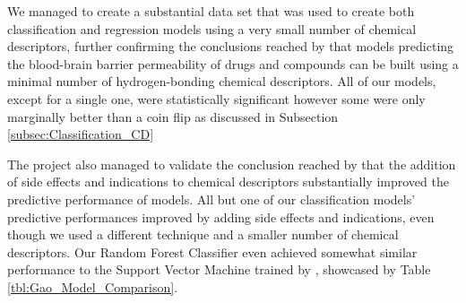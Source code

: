 We managed to create a substantial data set that was used to create both classification and regression models using a very small number of chemical descriptors, further confirming the conclusions reached by \citet{Zhao2007, Saber2020} that models predicting the blood-brain barrier permeability of drugs and compounds can be built using a minimal number of hydrogen-bonding chemical descriptors. All of our models, except for a single one, were statistically significant however some were only marginally better than a coin flip as discussed in Subsection \ref{subsec:Classification_CD}

The project also managed to validate the conclusion reached by \cite{Gao2017} that the addition of side effects and indications to chemical descriptors substantially improved the predictive performance of models. All but one of our classification models' predictive performances improved by adding side effects and indications, even though we used a different technique and a smaller number of chemical descriptors. Our Random Forest Classifier even achieved somewhat similar performance to the Support Vector Machine trained by \citet{Gao2017}, showcased by Table \ref{tbl:Gao_Model_Comparison}.
